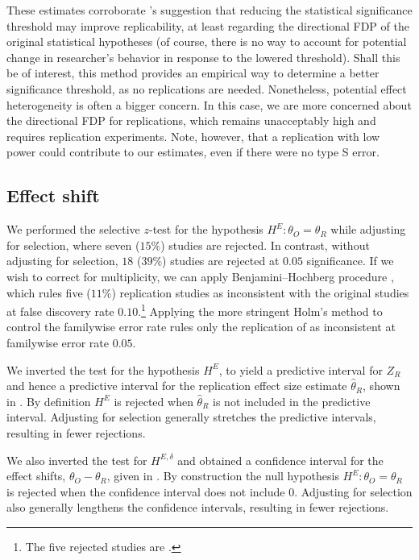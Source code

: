 \documentclass[11pt]{article}
\theoremstyle{definition}
\theoremstyle{custom}
\newcommand{\htheta}{\hat{\theta}}
\begin{document}
  These estimates corroborate \citet{Benjamin:2018gh}'s suggestion that reducing the statistical significance threshold may improve replicability, at least regarding the directional FDP of the original statistical hypotheses (of course, there is no way to account for potential change in researcher's behavior in response to the lowered threshold). Shall this be of interest, this method provides an empirical way to determine a better significance threshold, as no replications are needed. Nonetheless, potential effect heterogeneity is often a bigger concern. In this case, we are more concerned about the directional FDP for replications, which remains unacceptably high and requires replication experiments. Note, however, that a replication with low power could contribute to our estimates, even if there were no type S error.

\subsection{Effect shift}

  We performed the selective $z$-test for the hypothesis $H^E: \theta_O = \theta_R$ while adjusting for selection, where seven ($15\%$) studies are rejected. In contrast, without adjusting for selection, $18$ ($39\%$) studies are rejected at $0.05$ significance. If we wish to correct for multiplicity, we can apply Benjamini--Hochberg procedure \citeyearpar{Benjamini:1995cd}, which rules five ($11\%$) replication studies as inconsistent with the original studies at false discovery rate $0.10$.\footnote{The five rejected studies are \citet{Dodson:2008ks,vanDijk:2008br,PurdieVaughns:2008en,Farris:2008ev,Larsen:2008tu}.} Applying the more stringent Holm's method \citeyearpar{Holm:1979hl} to control the familywise error rate rules only the replication of \citet{Farris:2008ev} as inconsistent at familywise error rate $0.05$.

  We inverted the test for the hypothesis $H^E$, to yield a predictive interval for $Z_R$ and hence a predictive interval for the replication effect size estimate $\htheta_R$, shown in . By definition $H^E$ is rejected when $\htheta_R$ is not included in the predictive interval. Adjusting for selection generally stretches the predictive intervals, resulting in fewer rejections.

  We also inverted the test for $H^{E,\delta}$ and obtained a confidence interval for the effect shifts, $\theta_O - \theta_R$, given in . By construction the null hypothesis $H^E: \theta_O = \theta_R$ is rejected when the confidence interval does not include $0$. Adjusting for selection also generally lengthens the confidence intervals, resulting in fewer rejections.
\end{document}

